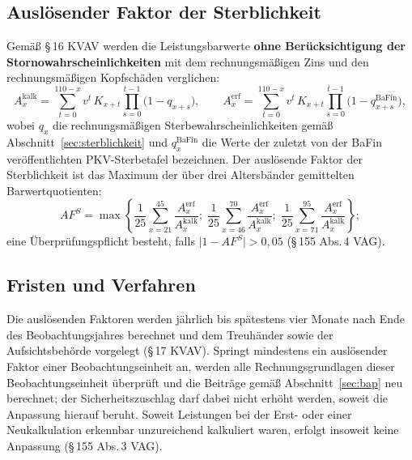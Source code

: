 \subsection{Auslösender Faktor der Sterblichkeit}\label{sec:af-sterb}

Gemäß \S\,16 KVAV werden die Leistungsbarwerte \textbf{ohne
Berücksichtigung der Stornowahrscheinlichkeiten} mit dem
rechnungsmäßigen Zins und den rechnungsmäßigen Kopfschäden verglichen:
\begin{equation}
A^{\mathrm{kalk}}_x = \sum_{t=0}^{110-x} v^t\, K_{x+t}
\prod_{s=0}^{t-1}\bigl(1-q_{x+s}\bigr),
\qquad
A^{\mathrm{erf}}_x = \sum_{t=0}^{110-x} v^t\, K_{x+t}
\prod_{s=0}^{t-1}\bigl(1-q^{\mathrm{BaFin}}_{x+s}\bigr),
\label{eq:af-barwerte}
\end{equation}
wobei $q_{x}$ die rechnungsmäßigen Sterbewahrscheinlichkeiten gemäß
Abschnitt~\ref{sec:sterblichkeit} und $q^{\mathrm{BaFin}}_{x}$ die
Werte der zuletzt von der BaFin veröffentlichten PKV-Sterbetafel
bezeichnen. Der auslösende Faktor der Sterblichkeit ist das Maximum
der über drei Altersbänder gemittelten Barwertquotienten:
\begin{equation}
AF^{S} = \max\left\{
\frac{1}{25}\sum_{x=21}^{45}\frac{A^{\mathrm{erf}}_x}{A^{\mathrm{kalk}}_x};\;
\frac{1}{25}\sum_{x=46}^{70}\frac{A^{\mathrm{erf}}_x}{A^{\mathrm{kalk}}_x};\;
\frac{1}{25}\sum_{x=71}^{95}\frac{A^{\mathrm{erf}}_x}{A^{\mathrm{kalk}}_x}
\right\};
\label{eq:af-s}
\end{equation}
eine Überprüfungspflicht besteht, falls
$\bigl|1 - AF^{S}\bigr| > 0{,}05$ (\S\,155 Abs.\,4 VAG).

\subsection{Fristen und Verfahren}\label{sec:af-verfahren}

Die auslösenden Faktoren werden jährlich bis spätestens vier Monate
nach Ende des Beobachtungsjahres berechnet und dem Treuhänder sowie
der Aufsichtsbehörde vorgelegt (\S\,17 KVAV). Springt mindestens ein
auslösender Faktor einer Beobachtungseinheit an, werden alle
Rechnungsgrundlagen dieser Beobachtungseinheit überprüft und die
Beiträge gemäß Abschnitt~\ref{sec:bap} neu berechnet; der
Sicherheitszuschlag darf dabei nicht erhöht werden, soweit die
Anpassung hierauf beruht. Soweit Leistungen bei der Erst- oder einer
Neukalkulation erkennbar unzureichend kalkuliert waren, erfolgt
insoweit keine Anpassung (\S\,155 Abs.\,3 VAG).
